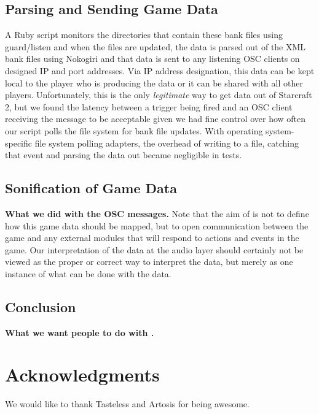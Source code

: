 \documentclass{nime-document-class}
\begin{document}
\subsection{Parsing and Sending Game Data}
A Ruby script monitors the directories that contain these bank files using guard/listen and when the files are updated, the data is parsed out of the XML bank files using Nokogiri and that data is sent to any listening OSC clients on designed IP and port addresses. Via IP address designation, this data can be kept local to the player who is producing the data or it can be shared with all other players. 
Unfortunately, this is the only {\em legitimate} way to get data out of Starcraft 2, but we found the latency between a trigger being fired and an OSC client receiving the message to be acceptable given we had fine control over how often our script polls the file system for bank file updates.
With operating system-specific file system polling adapters, the overhead of writing to a file, catching that event and parsing the data out became negligible in tests.

\subsection{Sonification of Game Data}
{\bf What we did with the OSC messages.}
Note that the aim of \projectName{} is not to define how this game data should be mapped, but to open communication between the game and any external modules that will respond to actions and events in the game.
Our interpretation of the data at the audio layer should certainly not be viewed as the proper or correct way to interpret the data, but merely as one instance of what can be done with the data.  

\subsection{Conclusion}
{\bf What we want people to do with \projectName{}.}

\section{Acknowledgments}
We would like to thank Tasteless and Artosis for being awesome.


{}

\end{document}
